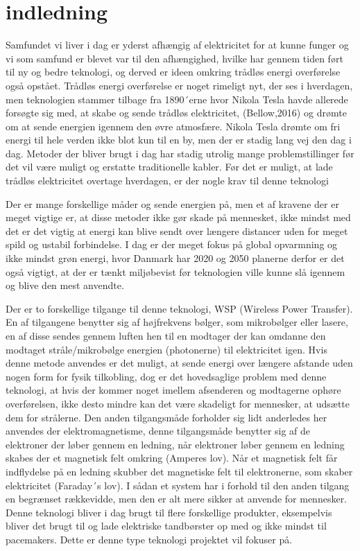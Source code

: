 \chapter{indledning}
Samfundet vi liver i dag er yderst afhængig af elektricitet for at kunne funger og vi som samfund er blevet var til den afhængighed, hvilke har gennem tiden ført til ny og bedre teknologi, og derved er ideen omkring trådløs energi overførelse også opstået. Trådløs energi overførelse er noget rimeligt nyt, der ses i hverdagen, men teknologien stammer tilbage fra 1890´erne hvor Nikola Tesla havde allerede forsøgte sig med, at skabe og sende trådløs elektricitet, (Bellow,2016) og drømte om at sende energien igennem den øvre atmosfære. Nikola Tesla drømte om fri energi til hele verden ikke blot kun til en by, men der er stadig lang vej den dag i dag. Metoder der bliver brugt i dag har stadig utrolig mange problemstillinger før det vil være muligt og erstatte traditionelle kabler. Før det er muligt, at lade trådløs elektricitet overtage hverdagen, er der nogle krav til denne teknologi 

Der er mange forskellige måder og sende energien på, men et af kravene der er meget vigtige er, at disse metoder ikke gør skade på mennesket, ikke mindst med det er det vigtig at energi kan blive sendt over længere distancer uden for meget spild og ustabil forbindelse. I dag er der meget fokus på global opvarmning og ikke mindst grøn energi, hvor Danmark har 2020 og 2050 planerne derfor er det også vigtigt, at der er tænkt miljøbevist før teknologien ville kunne slå igennem og blive den mest anvendte. 

Der er to forskellige tilgange til denne teknologi, WSP (Wireless Power Transfer). En af tilgangene benytter sig af højfrekvens bølger, som mikrobølger eller lasere, en af disse sendes gennem luften hen til en modtager der kan omdanne den modtaget stråle/mikrobølge energien (photonerne) til elektricitet igen. Hvis denne metode anvendes er det muligt, at sende energi over længere afstande uden nogen form for fysik tilkobling, dog er det hovedsaglige problem med denne teknologi, at hvis der kommer noget imellem afsenderen og modtagerne ophøre overførelsen, ikke desto mindre kan det være skadeligt for mennesker, at udsætte dem for strålerne. Den anden tilgangsmåde forholder sig lidt anderledes her anvendes der elektromagnetisme, denne tilgangsmåde benytter sig af de elektroner der løber gennem en ledning, når elektroner løber gennem en ledning skabes der et magnetisk felt omkring (Amperes lov).  Når et magnetisk felt får indflydelse på en ledning skubber det magnetiske felt  til elektronerne, som skaber elektricitet (Faraday´s lov). I sådan et system har i forhold til den anden tilgang en begrænset rækkevidde, men den er alt mere sikker at anvende for mennesker. Denne teknologi bliver i dag brugt til flere forskellige produkter, eksempelvis bliver det brugt til og lade elektriske tandbørster op med og ikke mindst til pacemakers. Dette er denne type teknologi projektet vil fokuser på. 
